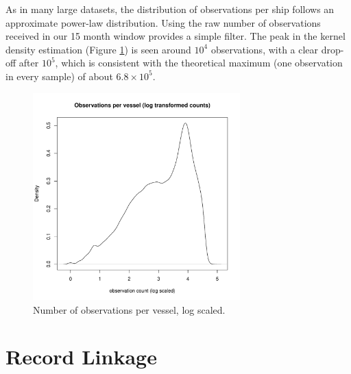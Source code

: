 


As in many large datasets, the distribution of observations per ship follows an approximate power-law distribution. Using the raw number of observations received in our 15 month window provides a simple filter. The peak in the kernel density estimation (Figure \ref{fig:obs-per-vessel-log}) is seen around $10^4$ observations, with a clear drop-off after $10^5$, which is consistent with the theoretical maximum (one observation in every sample) of about $6.8 \times 10^5$.

\begin{figure}[htbp]
  \centering
  \includegraphics[width=80mm]{figures/obs-per-vessel-log.pdf}
  \caption{Number of observations per vessel, log scaled.}
  \label{fig:obs-per-vessel-log}
\end{figure}

\section{Record Linkage}

